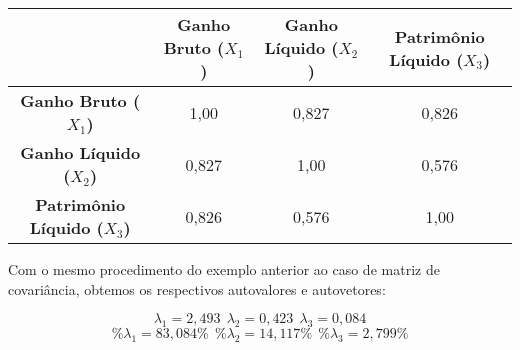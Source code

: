 \documentclass[
]{book}
\begin{document}
\begin{longtable}[]{@{}cccc@{}}
\toprule
& \textbf{Ganho Bruto (\(X_1\))} & \textbf{Ganho Líquido (\(X_2\))} & \textbf{Patrimônio Líquido (\(X_3\))}\tabularnewline
\midrule
\endhead
\textbf{Ganho Bruto (\(X_1\))} & 1,00 & 0,827 & 0,826\tabularnewline
\textbf{Ganho Líquido (\(X_2\))} & 0,827 & 1,00 & 0,576\tabularnewline
\textbf{Patrimônio Líquido (\(X_3\))} & 0,826 & 0,576 & 1,00\tabularnewline
\bottomrule
\end{longtable}

Com o mesmo procedimento do exemplo anterior ao caso de matriz de covariância, obtemos os respectivos autovalores e autovetores:

\[\lambda_1=2,493 \ \ \lambda_2=0,423 \ \ \lambda_3=0,084 \]
\[\%\lambda_1=83,084\% \ \ \%\lambda_2=14,117\% \ \ \%\lambda_3=2,799\%\]
\end{document}
